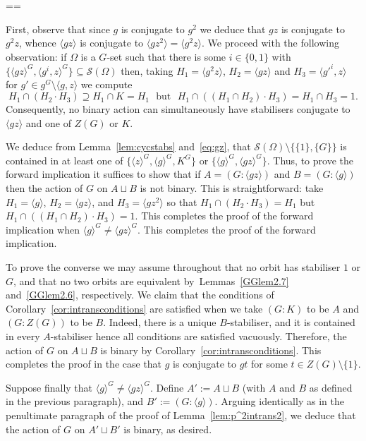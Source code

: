 \documentclass[11pt, a4paper]{amsart}
\makeatletter
\renewcommand{\proofname}{Proof}
\renewenvironment{proof}[1][\proofname]{\par
  \pushQED{\qed}  \normalfont \partopsep=\z@skip \topsep=\z@skip
  \trivlist
  \item[\hskip\labelsep
        \scshape
    #1\@addpunct{.}]\ignorespaces
}{  \popQED\endtrivlist\@endpefalse
}
\makeatother
\begin{document}
\begin{proof}
First, observe that since $g$ is conjugate to $g^2$ we deduce that $gz$ is conjugate to $g^2z$, whence $\langle gz\rangle$ is conjugate to $\langle gz^2\rangle=\langle g^2z\rangle$. We proceed with the following observation: if $\Omega$ is a $G$-set such that there is some $i\in \{0,1\}$ with $\{\langle gz\rangle^G,\langle g^i, z\rangle^G\}\subseteq\mathcal{S}(\Omega)$ then, taking $H_1=\langle g^2z\rangle$, $H_2=\langle gz\rangle$ and $H_3=\langle g'^i,z\rangle$ for $g'\in g^G\setminus\langle g,z\rangle$ we compute \begin{equation}\label{eq:gz}
    H_1\cap (H_2\cdot H_3)\supseteq H_1\cap K=H_1\,\,\text{ but }\,\, H_1\cap ((H_1\cap H_2)\cdot H_3)=H_1\cap H_3=1.
\end{equation}
Consequently, no binary action can simultaneously have stabilisers conjugate to $\langle gz\rangle$ and one of $Z(G)$ or $K$.

We deduce from Lemma~\ref{lem:cycstabs} and~\eqref{eq:gz},  that $\mathcal{S}(\Omega)\setminus\{\{1\},\{G\}\}$ is contained in at least one of
      $\{\langle z\rangle^G,\langle g\rangle^G,K^G\}$ or $\{\langle g\rangle^G, \langle gz\rangle^G\}.$ Thus, to prove the forward implication it suffices to show that if $A=(G:\langle gz\rangle)$ and $B=(G:\langle g\rangle)$  then the action of $G$ on $A\sqcup B$ is not binary. This is straightforward: take $H_1=\langle g\rangle$, $H_2=\langle gz\rangle$, and $H_3=\langle gz^2\rangle$ so that $H_1\cap (H_2\cdot H_3)=H_1$ but $H_1\cap ((H_1\cap H_2)\cdot H_3)=1$. This completes the proof of the forward implication when $\langle g\rangle^G\ne\langle gz\rangle^G$.
This completes the proof of the forward implication.

To prove the converse we may assume throughout that no orbit has stabiliser $1$ or $G$, and that no two orbits are equivalent by~Lemmas~\ref{GGlem2.7} and~\ref{GGlem2.6}, respectively.      
We claim that the conditions of Corollary~\ref{cor:intransconditions} are satisfied when we take $(G:K)$ to be $A$ and $(G:Z(G))$ to be $B$. Indeed, there is a unique $B$-stabiliser, and it is contained in every $A$-stabiliser hence all conditions are satisfied vacuously.     Therefore, the action of $G$ on $A\sqcup B$ is binary by Corollary~\ref{cor:intransconditions}. This completes the proof in the case that $g$ is conjugate to $gt$ for some $t\in Z(G)\setminus \{1\}$.
    
    Suppose finally that $\langle g\rangle^G\ne\langle gz\rangle^G$.  Define $A':=A\sqcup B$ (with $A$ and $B$ as defined in the previous paragraph), and $B':=(G:\langle g\rangle)$.     Arguing identically as in the penultimate paragraph of the proof of Lemma~\ref{lem:p^2intrans2}, we deduce that the action of $G$ on $A'\sqcup B'$ is binary, as desired. 
                                                  \end{proof}
\end{document}

